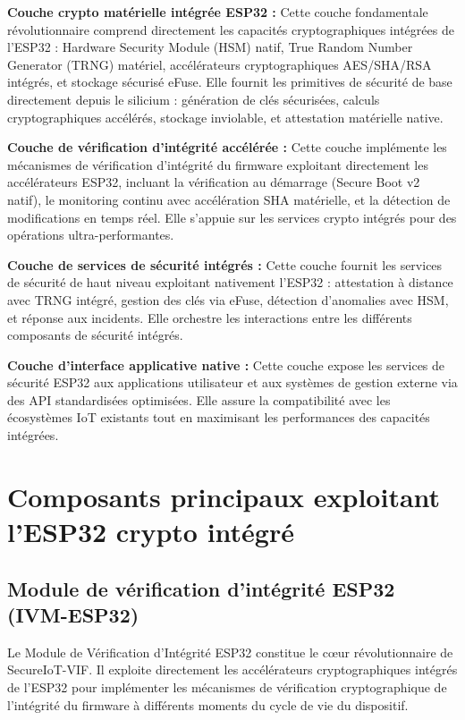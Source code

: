 \textbf{Couche crypto matérielle intégrée ESP32 :} Cette couche fondamentale révolutionnaire comprend directement les capacités cryptographiques intégrées de l'ESP32 : Hardware Security Module (HSM) natif, True Random Number Generator (TRNG) matériel, accélérateurs cryptographiques AES/SHA/RSA intégrés, et stockage sécurisé eFuse. Elle fournit les primitives de sécurité de base directement depuis le silicium : génération de clés sécurisées, calculs cryptographiques accélérés, stockage inviolable, et attestation matérielle native.

\textbf{Couche de vérification d'intégrité accélérée :} Cette couche implémente les mécanismes de vérification d'intégrité du firmware exploitant directement les accélérateurs ESP32, incluant la vérification au démarrage (Secure Boot v2 natif), le monitoring continu avec accélération SHA matérielle, et la détection de modifications en temps réel. Elle s'appuie sur les services crypto intégrés pour des opérations ultra-performantes.

\textbf{Couche de services de sécurité intégrés :} Cette couche fournit les services de sécurité de haut niveau exploitant nativement l'ESP32 : attestation à distance avec TRNG intégré, gestion des clés via eFuse, détection d'anomalies avec HSM, et réponse aux incidents. Elle orchestre les interactions entre les différents composants de sécurité intégrés.

\textbf{Couche d'interface applicative native :} Cette couche expose les services de sécurité ESP32 aux applications utilisateur et aux systèmes de gestion externe via des API standardisées optimisées. Elle assure la compatibilité avec les écosystèmes IoT existants tout en maximisant les performances des capacités intégrées.

\section{Composants principaux exploitant l'ESP32 crypto intégré}

\subsection{Module de vérification d'intégrité ESP32 (IVM-ESP32)}

Le Module de Vérification d'Intégrité ESP32 constitue le cœur révolutionnaire de SecureIoT-VIF. Il exploite directement les accélérateurs cryptographiques intégrés de l'ESP32 pour implémenter les mécanismes de vérification cryptographique de l'intégrité du firmware à différents moments du cycle de vie du dispositif.

